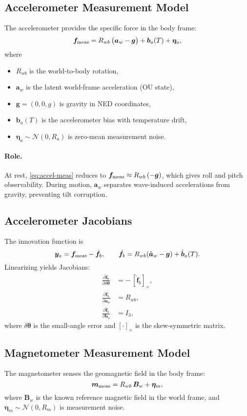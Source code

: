 \documentclass[11pt]{article}
\begin{document}
\subsection{Accelerometer Measurement Model}
The accelerometer provides the specific force in the body frame:
\begin{equation}
\bm f_{\rm meas} 
= R_{wb}\,\big(\bm a_w - \bm g\big) + \bm b_a(T) + \bm\eta_a,
\label{eq:accel-meas}
\end{equation}
where
\begin{itemize}
\item $R_{wb}$ is the world-to-body rotation,
\item $\bm a_w$ is the latent world-frame acceleration (OU state),
\item $\bm g = (0,0,g)$ is gravity in NED coordinates,
\item $\bm b_a(T)$ is the accelerometer bias with temperature drift,
\item $\bm\eta_a \sim \mathcal{N}(0,R_a)$ is zero-mean measurement noise.
\end{itemize}

\paragraph{Role.}
At rest, \eqref{eq:accel-meas} reduces to $\bm f_{\rm meas} \approx R_{wb}\,(-\bm g)$,
which gives roll and pitch observability. During motion, $\bm a_w$ separates wave-induced
accelerations from gravity, preventing tilt corruption.

\subsection{Accelerometer Jacobians}
The innovation function is
\[
\bm y_a = \bm f_{\rm meas} - \hat{\bm f}_b,
\qquad
\hat{\bm f}_b = R_{wb}(\hat{\bm a}_w - \bm g) + \hat{\bm b}_a(T).
\]
Linearizing yields Jacobians:
\begin{align}
\frac{\partial \hat{\bm f}_b}{\partial \delta\bm\theta} &= -\,[\hat{\bm f}_b]_\times,
\label{eq:accel-jac-att}\\
\frac{\partial \hat{\bm f}_b}{\partial \bm a_w} &= R_{wb},
\label{eq:accel-jac-aw}\\
\frac{\partial \hat{\bm f}_b}{\partial \bm b_a} &= I_3,
\label{eq:accel-jac-bias}
\end{align}
where $\delta\bm\theta$ is the small-angle error and $[\cdot]_\times$ is the skew-symmetric matrix.

\subsection{Magnetometer Measurement Model}
The magnetometer senses the geomagnetic field in the body frame:
\begin{equation}
\bm m_{\rm meas} = R_{wb}\,\bm B_w + \bm\eta_m,
\label{eq:mag-meas}
\end{equation}
where $\bm B_w$ is the known reference magnetic field in the world frame,
and $\bm\eta_m \sim \mathcal{N}(0,R_m)$ is measurement noise.
\end{document}
